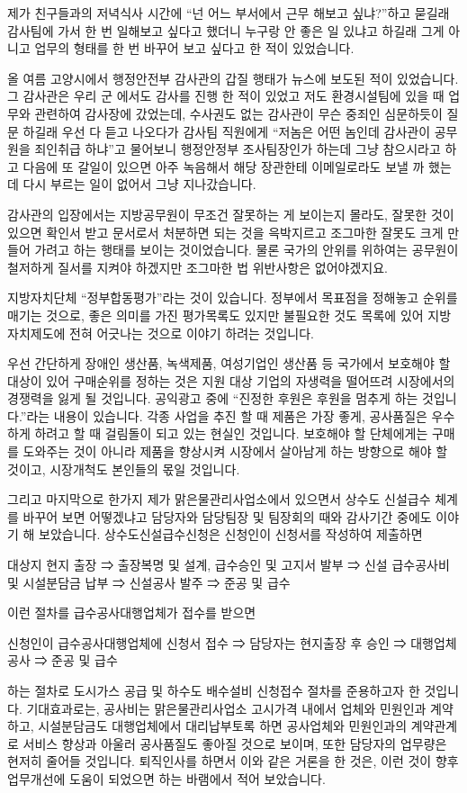 \documentclass[chapter,book,openany,twoside]{oblivoir}
\begin{document}
제가 친구들과의 저녁식사 시간에 ``넌 어느 부서에서 근무 해보고 싶냐?''하고 묻길래 감사팀에 가서 한 번 일해보고 싶다고 했더니 누구랑 안 좋은 일 있냐고 하길래 그게 아니고 업무의 형태를 한 번 바꾸어 보고 싶다고 한 적이 있었습니다. 

올 여름 고양시에서 행정안전부 감사관의 갑질 행태가 뉴스에 보도된 적이 있었습니다. 그 감사관은 우리 군 에서도 감사를 진행 한 적이 있었고 저도 환경시설팀에 있을 때 업무와 관련하여 감사장에 갔었는데, 수사권도 없는 감사관이 무슨 중죄인 심문하듯이 질문 하길래 우선 다 듣고 나오다가 감사팀 직원에게 ``저놈은 어떤 놈인데 감사관이 공무원을 죄인취급 하냐''고 물어보니 행정안정부 조사팀장인가 하는데 그냥 참으시라고 하고 다음에 또 갈일이 있으면 아주 녹음해서 해당 장관한테 이메일로라도 보낼 까 했는데 다시 부르는 일이 없어서 그냥 지나갔습니다. 

감사관의 입장에서는 지방공무원이 무조건 잘못하는 게 보이는지 몰라도, 잘못한 것이 있으면 확인서 받고 문서로서 처분하면 되는 것을 윽박지르고 조그마한 잘못도 크게 만들어 가려고 하는 행태를 보이는 것이었습니다. 물론 국가의 안위를 위하여는 공무원이 철저하게 질서를 지켜야 하겠지만 조그마한 법 위반사항은 없어야겠지요.

지방자치단체 ``정부합동평가''라는 것이 있습니다. 정부에서 목표점을 정해놓고 순위를 매기는 것으로, 좋은 의미를 가진 평가목록도 있지만 불필요한 것도 목록에 있어 지방자치제도에 전혀 어긋나는 것으로 이야기 하려는 것입니다. 

우선 간단하게 장애인 생산품, 녹색제품, 여성기업인 생산품 등 국가에서 보호해야 할 대상이 있어 구매순위를 정하는 것은 지원 대상 기업의 자생력을 떨어뜨려 시장에서의 경쟁력을 잃게 될 것입니다. 공익광고 중에 ``진정한 후원은 후원을 멈추게 하는 것입니다.''라는 내용이 있습니다. 각종 사업을 추진 할 때 제품은 가장 좋게, 공사품질은 우수하게 하려고 할 때 걸림돌이 되고 있는 현실인 것입니다. 보호해야 할 단체에게는 구매를 도와주는 것이 아니라 제품을 향상시켜 시장에서 살아남게 하는 방향으로 해야 할 것이고, 시장개척도 본인들의 몫일 것입니다.

그리고 마지막으로 한가지 제가 맑은물관리사업소에서 있으면서 상수도 신설급수 체계를 바꾸어 보면 어떻겠냐고 담당자와 담당팀장 및 팀장회의 때와 감사기간 중에도 이야기 해 보았습니다. 상수도신설급수신청은 신청인이 신청서를 작성하여 제출하면
\begin{center}
대상지 현지 출장 ⇒ 출장복명 및 설계, 급수승인 및 고지서 발부 ⇒ 신설 급수공사비 및 시설분담금 납부 ⇒ 신설공사 발주 ⇒ 준공 및 급수 
\end{center}
이런 절차를 급수공사대행업체가 접수를 받으면
\begin{center}
신청인이 급수공사대행업체에 신청서 접수 ⇒ 담당자는 현지출장 후 승인 ⇒ 대행업체 공사 ⇒ 준공 및 급수
\end{center}
 하는 절차로 도시가스 공급 및 하수도 배수설비 신청접수 절차를 준용하고자 한 것입니다. 기대효과로는, 공사비는 맑은물관리사업소 고시가격 내에서 업체와 민원인과 계약하고, 시설분담금도 대행업체에서 대리납부토록 하면 공사업체와 민원인과의 계약관계로 서비스 향상과 아울러 공사품질도 좋아질 것으로 보이며, 또한 담당자의 업무량은 현저히 줄어들 것입니다. 퇴직인사를 하면서 이와 같은 거론을 한 것은, 이런 것이 향후 업무개선에 도움이 되었으면 하는 바램에서 적어 보았습니다.
\end{document}
